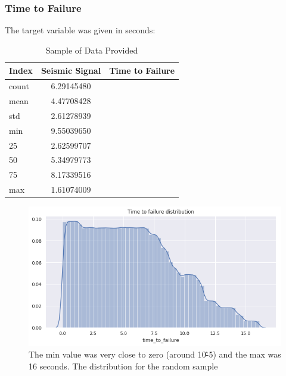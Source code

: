 \documentclass[]{llncs}
\begin{document}
\subsubsection{Time to Failure}
The target variable was given in seconds:
\begin{table}[h!]
	\begin{center}
		\caption{Sample of Data Provided}
		\label{tab:table1}
		\begin{tabular}{l|c|r} %
			\textbf{Index} & \textbf{Seismic Signal} & \textbf{Time to Failure}\\
			\hline
			count &  6.29145480\\ 
			mean & 4.47708428 \\ 
			std &  2.61278939\\ 
			min &  9.55039650\\ 
			25 & 2.62599707 \\ 
			50 &  5.34979773\\ 
			75 &  8.17339516\\ 
			max & 1.61074009 \\ 
		\end{tabular}
	\end{center}
\end{table}
\begin{figure}[h]
	\centering
	\includegraphics[width=0.7\linewidth]{../GPUProject/timeToFailureDistribution}
	\caption[]{The min value was very close to zero (around 10\^-5) and the max was 16 seconds. The distribution for the random sample}
	\label{fig:timetofailuredistribution}
\end{figure}
\end{document}
